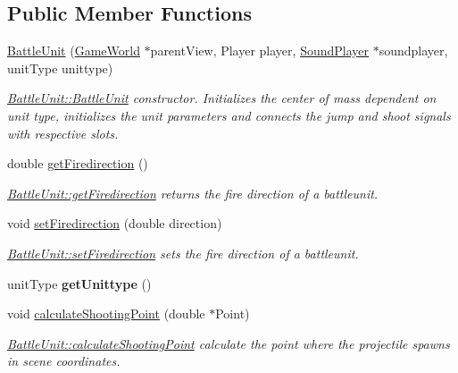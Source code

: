 \subsection*{Public Member Functions}
\begin{DoxyCompactItemize}
\item 
\hyperlink{class_battle_unit_ab89fc2d2730cc059c34bb7cd3473d2f0}{Battle\+Unit} (\hyperlink{class_game_world}{Game\+World} $\ast$parent\+View, Player player, \hyperlink{class_sound_player}{Sound\+Player} $\ast$soundplayer, unit\+Type unittype)
\begin{DoxyCompactList}\small\item\em \hyperlink{class_battle_unit_ab89fc2d2730cc059c34bb7cd3473d2f0}{Battle\+Unit\+::\+Battle\+Unit} constructor. Initializes the center of mass dependent on unit type, initializes the unit parameters and connects the jump and shoot signals with respective slots. \end{DoxyCompactList}\item 
double \hyperlink{class_battle_unit_aa5a7ea370e2f789b51f5617b45822bdb}{get\+Firedirection} ()
\begin{DoxyCompactList}\small\item\em \hyperlink{class_battle_unit_aa5a7ea370e2f789b51f5617b45822bdb}{Battle\+Unit\+::get\+Firedirection} returns the fire direction of a battleunit. \end{DoxyCompactList}\item 
void \hyperlink{class_battle_unit_ab038bbc9e82cea88af5a9228c0559463}{set\+Firedirection} (double direction)
\begin{DoxyCompactList}\small\item\em \hyperlink{class_battle_unit_ab038bbc9e82cea88af5a9228c0559463}{Battle\+Unit\+::set\+Firedirection} sets the fire direction of a battleunit. \end{DoxyCompactList}\item 
unit\+Type {\bfseries get\+Unittype} ()\hypertarget{class_battle_unit_a26e22880479bf89c7cc3cec7c8f84a0b}{}\label{class_battle_unit_a26e22880479bf89c7cc3cec7c8f84a0b}

\item 
void \hyperlink{class_battle_unit_a065ad7ba4c947aafd266b7a9e4c523a4}{calculate\+Shooting\+Point} (double $\ast$Point)
\begin{DoxyCompactList}\small\item\em \hyperlink{class_battle_unit_a065ad7ba4c947aafd266b7a9e4c523a4}{Battle\+Unit\+::calculate\+Shooting\+Point} calculate the point where the projectile spawns in scene coordinates. \end{DoxyCompactList}\end{DoxyCompactItemize}
